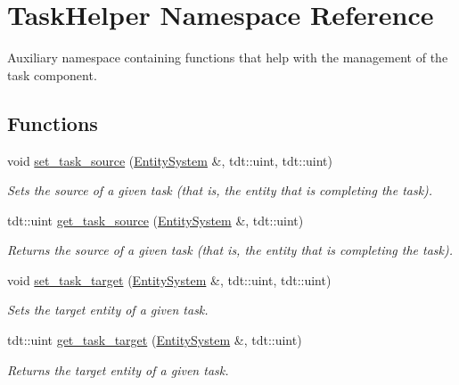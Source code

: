 \hypertarget{namespace_task_helper}{}\section{Task\+Helper Namespace Reference}
\label{namespace_task_helper}


Auxiliary namespace containing functions that help with the management of the task component.  


\subsection*{Functions}
\begin{DoxyCompactItemize}
\item 
void \hyperlink{namespace_task_helper_aa40c2f0ba5fc2d2055994c3c86c85299}{set\+\_\+task\+\_\+source} (\hyperlink{class_entity_system}{Entity\+System} \&, tdt\+::uint, tdt\+::uint)
\begin{DoxyCompactList}\small\item\em Sets the source of a given task (that is, the entity that is completing the task). \end{DoxyCompactList}\item 
tdt\+::uint \hyperlink{namespace_task_helper_a771b226db103ad50817aecab75cd5cb6}{get\+\_\+task\+\_\+source} (\hyperlink{class_entity_system}{Entity\+System} \&, tdt\+::uint)
\begin{DoxyCompactList}\small\item\em Returns the source of a given task (that is, the entity that is completing the task). \end{DoxyCompactList}\item 
void \hyperlink{namespace_task_helper_ab3ccb83696f0bf5445677ba3ac07d92e}{set\+\_\+task\+\_\+target} (\hyperlink{class_entity_system}{Entity\+System} \&, tdt\+::uint, tdt\+::uint)
\begin{DoxyCompactList}\small\item\em Sets the target entity of a given task. \end{DoxyCompactList}\item 
tdt\+::uint \hyperlink{namespace_task_helper_a164d8b3beeb68235743a93f91b6795b4}{get\+\_\+task\+\_\+target} (\hyperlink{class_entity_system}{Entity\+System} \&, tdt\+::uint)
\begin{DoxyCompactList}\small\item\em Returns the target entity of a given task. \end{DoxyCompactList}\item 

\end{DoxyCompactItemize}
